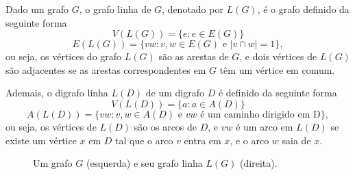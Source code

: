\begin{definicao}
Dado um grafo $G$, o grafo linha de $G$, denotado por $L(G)$, é o grafo definido da seguinte forma
\[V(L(G)) = \{e : e \in E(G)\}\]
\[E(L(G)) = \{vw : v,w \in E(G) \text{ e } |v \cap w| = 1\},\]
ou seja, os vértices do grafo $L(G)$ são as arestas de $G$, e dois vértices de $L(G)$ são adjacentes se as arestas correspondentes em $G$ têm um vértice em comum.

Ademais, o digrafo linha $L(D)$ de um digrafo $D$ é definido da seguinte forma
\[V(L(D)) = \{a : a \in A(D)\}\]
\[A(L(D)) = \{vw : v,w \in A(D) \text{ e } vw \text{ é um caminho dirigido em D}\},\]
ou seja, os vértices de $L(D)$ são os arcos de $D$, e $vw$ é um arco em $L(D)$ se existe um vértice $x$ em $D$ tal que o arco $v$ entra em $x$, e o arco $w$ saia de $x$.
\end{definicao}

\begin{figure}[H]
\centering
{}
\caption{Um grafo $G$ (esquerda) e seu grafo linha $L(G)$ (direita).}
\label{fig:shiftlinegraph}
\end{figure}

